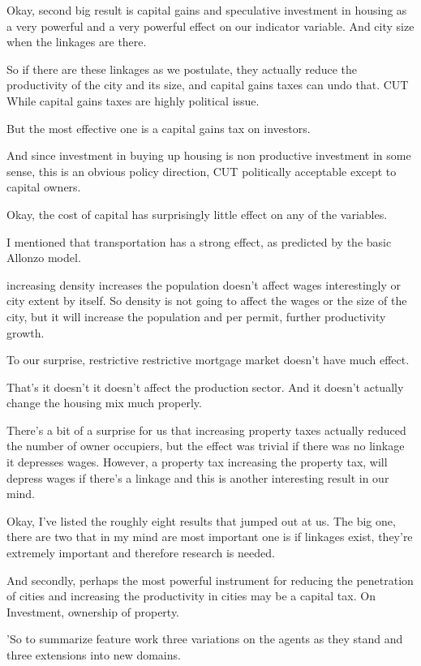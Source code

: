 \documentclass[]{article}
\begin{document}
Okay, second big result is capital gains and speculative investment in housing as a very powerful and a very powerful effect on our indicator variable. And city size when the linkages are there.


So if there are these linkages as we postulate, they actually reduce the productivity of the city and its size, and capital gains taxes can undo that. CUT While capital gains taxes are highly political issue.


But the most effective one is a capital gains tax on investors.


And since investment in buying up housing is non productive investment in some sense, this is an obvious policy direction, CUT politically acceptable except to capital owners.

Okay, the cost of capital has surprisingly little effect on any of the variables. 

I mentioned that transportation has a strong effect, as predicted by the basic Allonzo model. 

increasing density increases the population doesn't affect wages interestingly or city extent by itself. So density is not going to affect the wages or the size of the city, but it will increase the population and per permit, further productivity growth.


To our surprise, restrictive restrictive mortgage market doesn't have much effect.

That's it doesn't it doesn't affect the production sector. And it doesn't actually change the housing mix much properly. 

There's a bit of a surprise for us that increasing property taxes actually reduced the number of owner occupiers, but the effect was trivial if there was no linkage it depresses wages. However, a property tax increasing the property tax, will depress wages if there's a linkage and this is another interesting result in our mind. 

Okay, I've listed the roughly eight results that jumped out at us. The big one, there are two that in my mind are most important one is if linkages exist, they're extremely important and therefore research is needed.

And secondly, perhaps the most powerful instrument for reducing the penetration of cities and increasing the productivity in cities may be a capital tax. On Investment, ownership of property.

'So to summarize feature work three variations on the agents as they stand and three extensions into new domains. 
\end{document}
